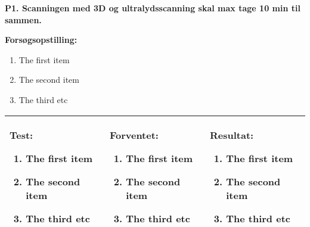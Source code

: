 



\Large\textbf{P1. Scanningen med 3D og ultralydsscanning skal max tage 10 min til sammen.}

\textbf{Forsøgsopstilling:}
\begin{enumerate}
\item The first item
\item The second item
\item The third etc 
\end{enumerate}

\begin{tabular}{ |p{5cm}|p{5cm}| p{5cm}| }
\hline

\textbf{Test:}
\begin{enumerate}
\item The first item
\item The second item
\item The third etc 
\end{enumerate} & 

\textbf{Forventet:} 
\begin{enumerate}
\item The first item
\item The second item
\item The third etc 
\end{enumerate} & 

\textbf{Resultat:}
\begin{enumerate}
\item The first item
\item The second item
\item The third etc 
\end{enumerate}\\
\hline

\end{tabular}

